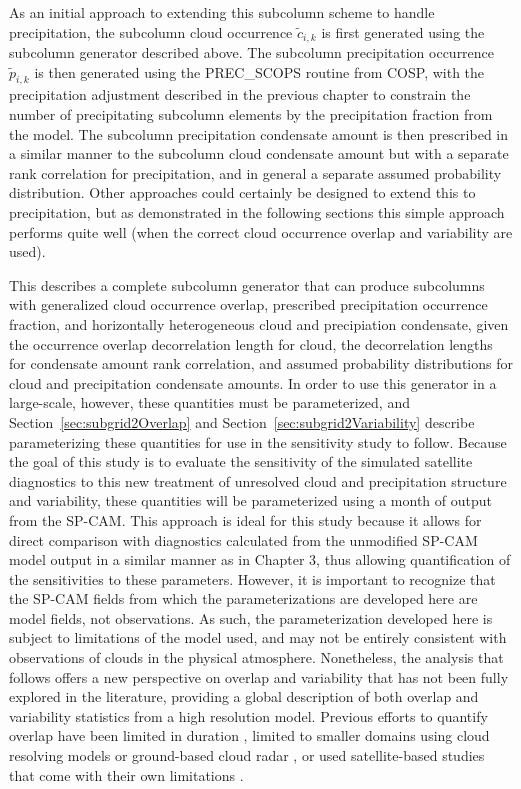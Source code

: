 As an initial approach to extending this subcolumn scheme to handle
precipitation, the subcolumn cloud occurrence \(\tilde{c}_{i, k}\) is
first generated using the subcolumn generator described above. The
subcolumn precipitation occurrence \(\tilde{p}_{i, k}\) is then
generated using the PREC\_SCOPS routine from COSP, with the
precipitation adjustment described in the previous chapter to constrain
the number of precipitating subcolumn elements by the precipitation
fraction from the model. The subcolumn precipitation condensate amount
is then prescribed in a similar manner to the subcolumn cloud condensate
amount but with a separate rank correlation for precipitation, and in
general a separate assumed probability distribution. Other approaches
could certainly be designed to extend this to precipitation, but as
demonstrated in the following sections this simple approach performs
quite well (when the correct cloud occurrence overlap and variability
are used).

This describes a complete subcolumn generator that can produce
subcolumns with generalized cloud occurrence overlap, prescribed
precipitation occurrence fraction, and horizontally heterogeneous cloud
and precipiation condensate, given the occurrence overlap decorrelation
length for cloud, the decorrelation lengths for condensate amount rank
correlation, and assumed probability distributions for cloud and
precipitation condensate amounts. In order to use this generator in a
large-scale, however, these quantities must be parameterized, and
Section~\ref{sec:subgrid2Overlap} and
Section~\ref{sec:subgrid2Variability} describe parameterizing these
quantities for use in the sensitivity study to follow. Because the goal
of this study is to evaluate the sensitivity of the simulated satellite
diagnostics to this new treatment of unresolved cloud and precipitation
structure and variability, these quantities will be parameterized using
a month of output from the SP-CAM. This approach is ideal for this study
because it allows for direct comparison with diagnostics calculated from
the unmodified SP-CAM model output in a similar manner as in Chapter 3,
thus allowing quantification of the sensitivities to these parameters.
However, it is important to recognize that the SP-CAM fields from which
the parameterizations are developed here are model fields, not
observations. As such, the parameterization developed here is subject to
limitations of the model used, and may not be entirely consistent with
observations of clouds in the physical atmosphere. Nonetheless, the
analysis that follows offers a new perspective on overlap and
variability that has not been fully explored in the literature,
providing a global description of both overlap and variability
statistics from a high resolution model. Previous efforts to quantify
overlap have been limited in duration \citep{raisanen_et_al_2004},
limited to smaller domains using cloud resolving models
\citep{pincus_et_al_2005} or ground-based cloud radar
\citep{hogan_and_illingworth_2000, mace_and_benson-troth_2002}, or used
satellite-based studies that come with their own limitations
\citep{barker_2008, oreopoulos_et_al_2012}.

